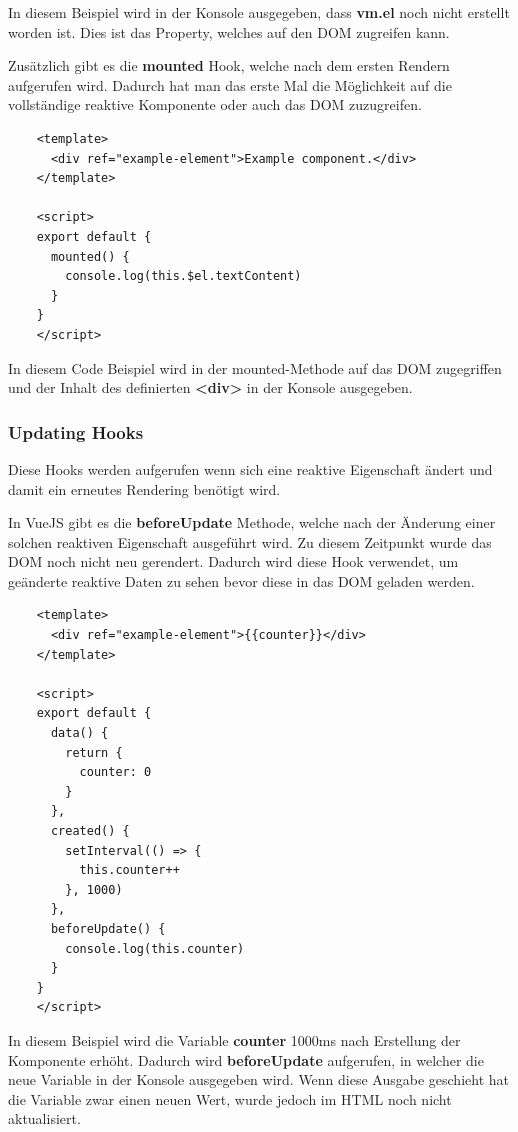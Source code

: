 In diesem Beispiel wird in der Konsole ausgegeben, dass \textbf{vm.el} noch nicht erstellt worden ist. Dies ist das Property, welches auf den DOM zugreifen kann. 

Zusätzlich gibt es die \textbf{mounted} Hook, welche nach dem ersten Rendern aufgerufen wird. Dadurch hat man das erste Mal die Möglichkeit auf die vollständige reaktive Komponente oder auch das DOM zuzugreifen.

\begin{lstlisting}
    <template>
      <div ref="example-element">Example component.</div>
    </template>
    
    <script>
    export default {
      mounted() {
        console.log(this.$el.textContent)
      }
    }
    </script>
\end{lstlisting}

In diesem Code Beispiel wird in der mounted-Methode auf das DOM zugegriffen und der Inhalt des definierten \textbf{<div>} in der Konsole ausgegeben.
\cite{frontend_web_vuejs_lifecycle}

\subsubsection{Updating Hooks}
Diese Hooks werden aufgerufen wenn sich eine reaktive Eigenschaft ändert und damit ein erneutes Rendering benötigt wird.

In VueJS gibt es die \textbf{beforeUpdate} Methode, welche nach der Änderung einer solchen reaktiven Eigenschaft ausgeführt wird. Zu diesem Zeitpunkt wurde das DOM noch nicht neu gerendert. Dadurch wird diese Hook verwendet, um geänderte reaktive Daten zu sehen bevor diese in das DOM geladen werden.

\begin{lstlisting}
    <template>
      <div ref="example-element">{{counter}}</div>
    </template>
    
    <script>
    export default {
      data() {
        return {
          counter: 0
        }
      },
      created() {
        setInterval(() => {
          this.counter++
        }, 1000)
      },
      beforeUpdate() {
        console.log(this.counter)
      }
    }
    </script>
\end{lstlisting}

In diesem Beispiel wird die Variable \textbf{counter} 1000ms nach Erstellung der Komponente erhöht. Dadurch wird \textbf{beforeUpdate} aufgerufen, in welcher die neue Variable in der Konsole ausgegeben wird. Wenn diese Ausgabe geschieht hat die Variable zwar einen neuen Wert, wurde jedoch im HTML noch nicht aktualisiert.


